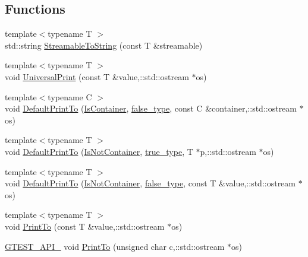 \subsection*{Functions}
\begin{DoxyCompactItemize}
\item 
{\footnotesize template$<$typename T $>$ }\\std\+::string \hyperlink{namespacetesting_1_1internal_aad4beed95d0846e6ffc5da0978ef3bb9}{Streamable\+To\+String} (const T \&streamable)
\item 
{\footnotesize template$<$typename T $>$ }\\void \hyperlink{namespacetesting_1_1internal_ad121a890bddf866e59605d1a0198dada}{Universal\+Print} (const T \&value,\+::std\+::ostream $\ast$os)
\item 
{\footnotesize template$<$typename C $>$ }\\void \hyperlink{namespacetesting_1_1internal_a729016f07085b1cfb44d21331f791141}{Default\+Print\+To} (\hyperlink{namespacetesting_1_1internal_ad8f0c2883245f1df2a53618a49f0deb3}{Is\+Container}, \hyperlink{namespacetesting_1_1internal_abb1d0789f19bdde21affccbd1078b525}{false\+\_\+type}, const C \&container,\+::std\+::ostream $\ast$os)
\item 
{\footnotesize template$<$typename T $>$ }\\void \hyperlink{namespacetesting_1_1internal_aa8dafaf55c18333baa5fdb858e69be96}{Default\+Print\+To} (\hyperlink{namespacetesting_1_1internal_abf080521ce135deb510e0a7830fd3d33}{Is\+Not\+Container}, \hyperlink{namespacetesting_1_1internal_a62f917c3424d8841de9b49b5ec28edb4}{true\+\_\+type}, T $\ast$p,\+::std\+::ostream $\ast$os)
\item 
{\footnotesize template$<$typename T $>$ }\\void \hyperlink{namespacetesting_1_1internal_a29e705ab252af57e825a086bb49c4831}{Default\+Print\+To} (\hyperlink{namespacetesting_1_1internal_abf080521ce135deb510e0a7830fd3d33}{Is\+Not\+Container}, \hyperlink{namespacetesting_1_1internal_abb1d0789f19bdde21affccbd1078b525}{false\+\_\+type}, const T \&value,\+::std\+::ostream $\ast$os)
\item 
{\footnotesize template$<$typename T $>$ }\\void \hyperlink{namespacetesting_1_1internal_a46859938b459a1581ec760755bc81fc7}{Print\+To} (const T \&value,\+::std\+::ostream $\ast$os)
\item 
\hyperlink{gtest-port_8h_aa73be6f0ba4a7456180a94904ce17790}{G\+T\+E\+S\+T\+\_\+\+A\+P\+I\+\_\+} void \hyperlink{namespacetesting_1_1internal_ad75960e2329e424819e3f414b7f432f7}{Print\+To} (unsigned char c,\+::std\+::ostream $\ast$os)

\end{DoxyCompactItemize}
